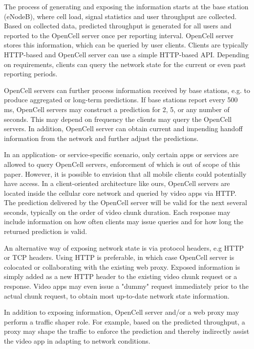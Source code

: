 The process of generating and exposing the information starts at the base station (eNodeB), where cell load, signal statistics and user throughput are collected. Based on collected data, predicted throughput is generated for all users and reported to the OpenCell server once per reporting interval. OpenCell server stores this information, which can be queried by user clients. Clients are typically HTTP-based and OpenCell server can use a simple HTTP-based API. Depending on requirements, clients can query the network state for the current or even past reporting periods. 

OpenCell servers can further process information received by base stations, e.g. to produce aggregated or long-term predictions. If base stations report every 500 ms, OpenCell servers may construct a prediction for 2, 5, or any number of seconds. This may depend on frequency the clients may query the OpenCell servers. In addition, OpenCell server can obtain current and impending handoff information from the network and further adjust the predictions.

In an application- or service-specific scenario, only certain apps or services are allowed to query OpenCell servers, enforcement of which is out of scope of this paper. However, it is possible to envision that all mobile clients could potentially have access. In a client-oriented architecture like ours, OpenCell servers are located inside the cellular core network and queried by video apps via HTTP. The prediction delivered by the OpenCell server will be valid for the next several seconds, typically on the order of video chunk duration. Each response may include information on how often clients may issue queries and for how long the returned prediction is valid.

An alternative way of exposing network state is via protocol headers, e.g HTTP or TCP headers. Using HTTP is preferable, in which case OpenCell server is colocated or collaborating with the existing web proxy. Exposed information is simply added as a new HTTP header to the existing video chunk request or a response. Video apps may even issue a "dummy" request immediately prior to the actual chunk request, to obtain most up-to-date network state information.

In addition to exposing information, OpenCell server and/or a web proxy may perform a traffic shaper role. For example, based on the predicted throughput, a proxy may shape the traffic to enforce the prediction and thereby indirectly assist the video app in adapting to network conditions. 

